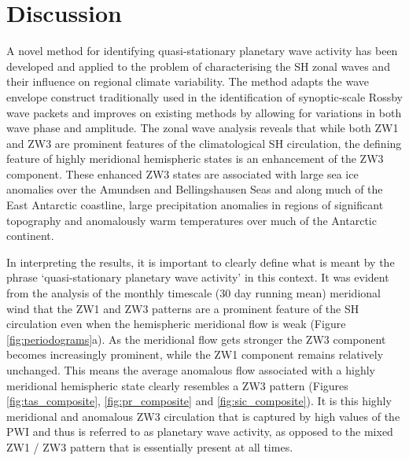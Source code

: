 \section{Discussion}


A novel method for identifying quasi-stationary planetary wave activity has been developed and applied to the problem of characterising the SH zonal waves and their influence on regional climate variability. The method adapts the wave envelope construct traditionally used in the identification of synoptic-scale Rossby wave packets and improves on existing methods by allowing for variations in both wave phase and amplitude. The zonal wave analysis reveals that while both ZW1 and ZW3 are prominent features of the climatological SH circulation, the defining feature of highly meridional hemispheric states is an enhancement of the ZW3 component. These enhanced ZW3 states are associated with large sea ice anomalies over the Amundsen and Bellingshausen Seas and along much of the East Antarctic coastline, large precipitation anomalies in regions of significant topography and anomalously warm temperatures over much of the Antarctic continent. 

In interpreting the results, it is important to clearly define what is meant by the phrase `quasi-stationary planetary wave activity' in this context. It was evident from the analysis of the monthly timescale (30 day running mean) meridional wind that the ZW1 and ZW3 patterns are a prominent feature of the SH circulation even when the hemispheric meridional flow is weak (Figure \ref{fig:periodograms}a). As the meridional flow gets stronger the ZW3 component becomes increasingly prominent, while the ZW1 component remains relatively unchanged. This means the average anomalous flow associated with a highly meridional hemispheric state clearly resembles a ZW3 pattern (Figures \ref{fig:tas_composite}, \ref{fig:pr_composite} and \ref{fig:sic_composite}). It is this highly meridional and anomalous ZW3 circulation that is captured by high values of the PWI and thus is referred to as planetary wave activity, as opposed to the mixed ZW1 / ZW3 pattern that is essentially present at all times.  

